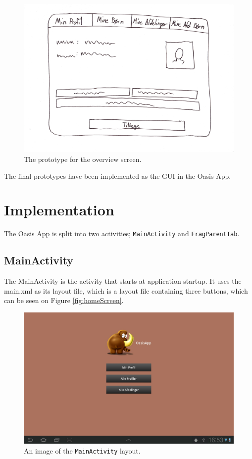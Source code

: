 \begin{figure}[H]
	\centering
		\includegraphics[width=\textwidth]{Images/overviewScreenPrototype}
	\caption{The prototype for the overview screen.}
	\label{fig:overviewScreenProto}
\end{figure}

The final prototypes have been implemented as the GUI in the Oasis App.

\section{Implementation}
\label{sec:AppImp}
The Oasis App is split into two activities; \texttt{MainActivity} and \texttt{FragParentTab}.

\subsection{MainActivity}
The MainActivity is the activity that starts at application startup. It uses the main.xml as its layout file, which is a layout file containing three buttons, which can be seen on Figure \vref{fig:homeScreen}. 

\begin{figure}[H]
	\centering
		\includegraphics[width=\textwidth]{Images/homeScreen}
	\caption{An image of the \texttt{MainActivity} layout.}
	\label{fig:homeScreen}
\end{figure}

